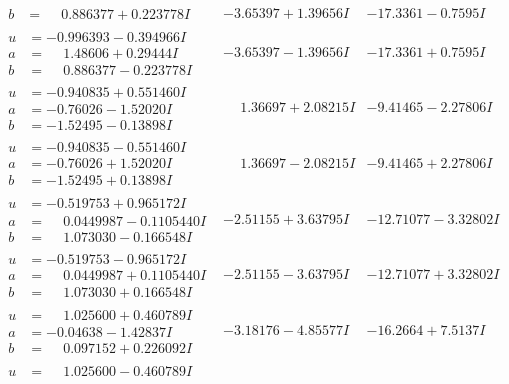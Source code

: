 \documentclass[1p]{elsarticle_modified}
\theoremstyle{definition}
\begin{document}
$$\begin{array}{c|c|c}
\begin{aligned}
b &= \phantom{-}0.886377 + 0.223778 I\end{aligned}
 & -3.65397 + 1.39656 I & -17.3361 - 0.7595 I \\ \hline\begin{aligned}
u &= -0.996393 - 0.394966 I \\
a &= \phantom{-}1.48606 + 0.29444 I \\
b &= \phantom{-}0.886377 - 0.223778 I\end{aligned}
 & -3.65397 - 1.39656 I & -17.3361 + 0.7595 I \\ \hline\begin{aligned}
u &= -0.940835 + 0.551460 I \\
a &= -0.76026 - 1.52020 I \\
b &= -1.52495 - 0.13898 I\end{aligned}
 & \phantom{-}1.36697 + 2.08215 I & -9.41465 - 2.27806 I \\ \hline\begin{aligned}
u &= -0.940835 - 0.551460 I \\
a &= -0.76026 + 1.52020 I \\
b &= -1.52495 + 0.13898 I\end{aligned}
 & \phantom{-}1.36697 - 2.08215 I & -9.41465 + 2.27806 I \\ \hline\begin{aligned}
u &= -0.519753 + 0.965172 I \\
a &= \phantom{-}0.0449987 - 0.1105440 I \\
b &= \phantom{-}1.073030 - 0.166548 I\end{aligned}
 & -2.51155 + 3.63795 I & -12.71077 - 3.32802 I \\ \hline\begin{aligned}
u &= -0.519753 - 0.965172 I \\
a &= \phantom{-}0.0449987 + 0.1105440 I \\
b &= \phantom{-}1.073030 + 0.166548 I\end{aligned}
 & -2.51155 - 3.63795 I & -12.71077 + 3.32802 I \\ \hline\begin{aligned}
u &= \phantom{-}1.025600 + 0.460789 I \\
a &= -0.04638 - 1.42837 I \\
b &= \phantom{-}0.097152 + 0.226092 I\end{aligned}
 & -3.18176 - 4.85577 I & -16.2664 + 7.5137 I \\ \hline\begin{aligned}
u &= \phantom{-}1.025600 - 0.460789 I \\

\end{aligned}
\end{array}$$
\end{document}
